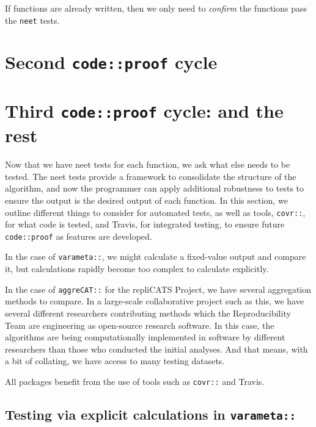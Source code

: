 \documentclass[
]{article}
\begin{document}
If functions are already written, then we only need to \emph{confirm} the functions pass the \texttt{neet} tests.

\hypertarget{second-codeproof-cycle}{%
\section{\texorpdfstring{Second \texttt{code::proof} cycle}{Second code::proof cycle}}\label{second-codeproof-cycle}}

\hypertarget{third-codeproof-cycle-and-the-rest}{%
\section{\texorpdfstring{Third \texttt{code::proof} cycle: and the rest}{Third code::proof cycle: and the rest}}\label{third-codeproof-cycle-and-the-rest}}

Now that we have neet tests for each function, we ask what else needs to be tested. The neet tests provide a framework to consolidate the structure of the algorithm, and now the programmer can apply additional robustness to tests to ensure the output is the desired output of each function. In this section, we outline different things to consider for automated tests, as well as tools, \texttt{covr::}, for what code is tested, and Travis, for integrated testing, to ensure future \texttt{code::proof} as features are developed.

In the case of \texttt{varameta::}, we might calculate a fixed-value output and compare it, but calculations rapidly become too complex to calculate explicitly.

In the case of \texttt{aggreCAT::} for the repliCATS Project, we have several aggregation methods to compare. In a large-scale collaborative project such as this, we have several different researchers contributing methods which the Reproducibility Team are engineering as open-source research software. In this case, the algorithms are being computationally implemented in software by different researchers than those who conducted the initial analyses. And that means, with a bit of collating, we have access to many testing datasets.

All packages benefit from the use of tools such as \texttt{covr::} and Travis.

\hypertarget{testing-via-explicit-calculations-in-varameta}{%
\subsection{\texorpdfstring{Testing via explicit calculations in \texttt{varameta::}}{Testing via explicit calculations in varameta::}}\label{testing-via-explicit-calculations-in-varameta}}
\end{document}
